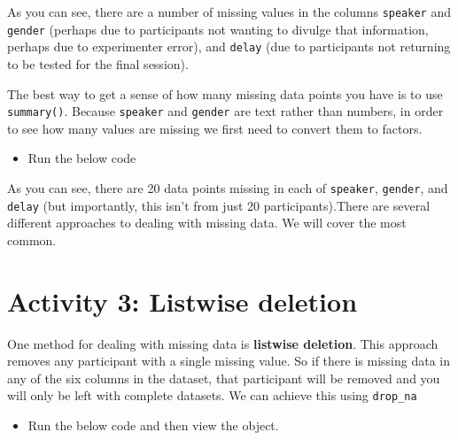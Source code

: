 \documentclass[]{book}
\newenvironment{Shaded}{\begin{snugshade}}{\end{snugshade}}
\newcommand{\CommentTok}[1]{\textcolor[rgb]{0.56,0.35,0.01}{\textit{#1}}}
\newcommand{\DataTypeTok}[1]{\textcolor[rgb]{0.13,0.29,0.53}{#1}}
\newcommand{\KeywordTok}[1]{\textcolor[rgb]{0.13,0.29,0.53}{\textbf{#1}}}
\newcommand{\NormalTok}[1]{#1}
\newcommand{\OperatorTok}[1]{\textcolor[rgb]{0.81,0.36,0.00}{\textbf{#1}}}
\newcommand{\StringTok}[1]{\textcolor[rgb]{0.31,0.60,0.02}{#1}}
\providecommand{\tightlist}{%
  \setlength{\itemsep}{0pt}\setlength{\parskip}{0pt}}
\begin{document}
As you can see, there are a number of missing values in the columns \texttt{speaker} and \texttt{gender} (perhaps due to participants not wanting to divulge that information, perhaps due to experimenter error), and \texttt{delay} (due to participants not returning to be tested for the final session).

The best way to get a sense of how many missing data points you have is to use \texttt{summary()}. Because \texttt{speaker} and \texttt{gender} are text rather than numbers, in order to see how many values are missing we first need to convert them to factors.

\begin{itemize}
\tightlist
\item
  Run the below code
\end{itemize}

\begin{Shaded}
\end{Shaded}

As you can see, there are 20 data points missing in each of \texttt{speaker}, \texttt{gender}, and \texttt{delay} (but importantly, this isn't from just 20 participants).There are several different approaches to dealing with missing data. We will cover the most common.

\hypertarget{activity-3-listwise-deletion}{%
\section{Activity 3: Listwise deletion}\label{activity-3-listwise-deletion}}

One method for dealing with missing data is \textbf{listwise deletion}. This approach removes any participant with a single missing value. So if there is missing data in any of the six columns in the dataset, that participant will be removed and you will only be left with complete datasets. We can achieve this using \texttt{drop\_na}

\begin{itemize}
\tightlist
\item
  Run the below code and then view the object.
\end{itemize}
\end{document}
